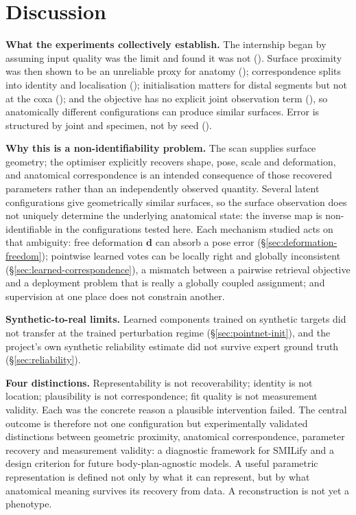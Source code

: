 \section{Discussion}

\textbf{What the experiments collectively establish.} The internship began
by assuming input quality was the limit and found it was not ().
Surface proximity was then shown to be an unreliable proxy for anatomy
(); correspondence splits into identity and localisation ();
initialisation matters for distal segments but not at the coxa ();
and the objective has no explicit joint observation term (), so
anatomically different configurations can produce similar surfaces. Error is
structured by joint and specimen, not by seed ().

\textbf{Why this is a non-identifiability problem.} The scan supplies
surface geometry; the optimiser explicitly recovers shape, pose, scale and
deformation, and anatomical correspondence is an intended consequence of
those recovered parameters rather than an independently observed quantity.
Several latent configurations give geometrically similar surfaces, so the
surface observation does not uniquely determine the underlying anatomical
state: the inverse map is non-identifiable in the configurations tested here.
Each mechanism studied acts on that ambiguity: free deformation $\mathbf d$
can absorb a pose error (\S\ref{sec:deformation-freedom}); pointwise learned
votes can be locally right and globally inconsistent
(\S\ref{sec:learned-correspondence}), a mismatch between a pairwise
retrieval objective and a deployment problem that is really a globally
coupled assignment; and supervision at one place does not constrain another.

\textbf{Synthetic-to-real limits.} Learned components trained on synthetic
targets did not transfer at the trained perturbation regime
(\S\ref{sec:pointnet-init}), and the project's own synthetic reliability
estimate did not survive expert ground truth (\S\ref{sec:reliability}).

\textbf{Four distinctions.} Representability is not recoverability;
identity is not location; plausibility is not correspondence; fit quality is
not measurement validity. Each was the concrete reason a plausible
intervention failed. The central outcome is therefore not one configuration
but experimentally validated distinctions between geometric proximity,
anatomical correspondence, parameter recovery and measurement validity: a
diagnostic framework for SMILify and a design criterion for future
body-plan-agnostic models. A useful parametric representation is defined not
only by what it can represent, but by what anatomical meaning survives its
recovery from data. A reconstruction is not yet a phenotype.

